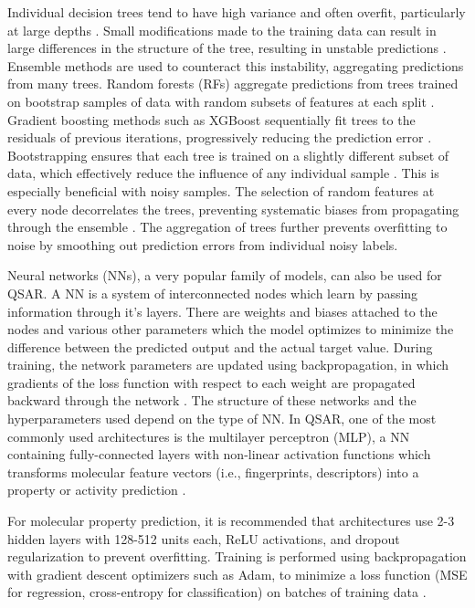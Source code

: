 Individual decision trees tend to have high variance and often overfit, particularly at large depths \citep{Breiman1984}. Small modifications made to the training data can result in large differences in the structure of the tree, resulting in unstable predictions \citep{Breiman2001}. Ensemble methods are used to counteract this instability, aggregating predictions from many trees. Random forests (RFs) aggregate predictions from trees trained on bootstrap samples of data with random subsets of features at each split \citep{Breiman2001}. Gradient boosting methods such as XGBoost sequentially fit trees to the residuals of previous iterations, progressively reducing the prediction error \citep{Chen2016}. Bootstrapping ensures that each tree is trained on a slightly different subset of data, which effectively reduce the influence of any individual sample \citep{Breiman2001}. This is especially beneficial with noisy samples. The selection of random features at every node decorrelates the trees, preventing systematic biases from propagating through the ensemble \citep{Breiman2001}. The aggregation of trees further prevents overfitting to noise by smoothing out prediction errors from individual noisy labels. 

Neural networks (NNs), a very popular family of models, can also be used for QSAR. A NN is a system of interconnected nodes which learn by passing information through it's layers. There are weights and biases attached to the nodes and various other parameters which the model optimizes to minimize the difference between the predicted output and the actual target value. During training, the network parameters are updated using backpropagation, in which gradients of the loss function with respect to each weight are propagated backward through the network \citep{Hornik1989}. The structure of these networks and the hyperparameters used depend on the type of NN. In QSAR, one of the most commonly used architectures is the multilayer perceptron (MLP), a NN containing fully-connected layers with non-linear activation functions which transforms molecular feature vectors (i.e., fingerprints, descriptors) into a property or activity prediction \citep{Ma2015}.

For molecular property prediction, it is recommended that architectures use 2-3 hidden layers with 128-512 units each, ReLU activations, and dropout regularization to prevent overfitting. Training is performed using backpropagation with gradient descent optimizers such as Adam, to minimize a loss function (MSE for regression, cross-entropy for classification) on batches of training data \citep{wu2018}. 

